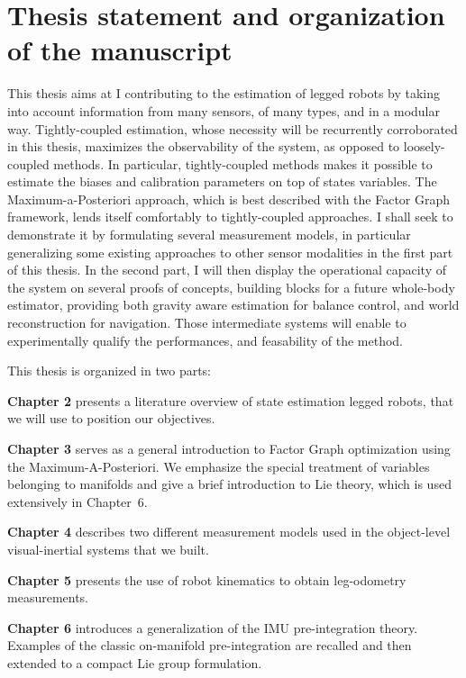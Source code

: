 \section{Thesis statement and organization of the manuscript}
\label{sec:thesis_organization}

This thesis aims at I contributing to the estimation of legged robots by taking into account information from
many sensors, of many types, and in a modular way. Tightly-coupled estimation, whose necessity will be recurrently corroborated in this thesis, maximizes the observability
of the system, as opposed to loosely-coupled methods. In particular, tightly-coupled methods makes it possible to estimate the biases and calibration parameters
on top of states variables. The Maximum-a-Posteriori approach, which is best described with the Factor Graph framework, lends itself comfortably 
to tightly-coupled approaches. I shall seek to demonstrate it by formulating several measurement models, in particular generalizing some existing approaches to other sensor modalities
in the first part of this thesis. In the second part,
I will then display the operational capacity of the system on several proofs of concepts, building blocks for a future whole-body estimator, providing both gravity aware
estimation for balance control, and world reconstruction for navigation. Those intermediate systems will enable to experimentally qualify the performances, 
and feasability of the method.

This thesis is organized in two parts:

\bigskip
\textbf{Chapter 2} presents a literature overview of state estimation legged robots, that we will use to position our objectives.

\bigskip
\textbf{Chapter 3} serves as a general introduction to Factor Graph optimization using the Maximum-A-Posteriori. We emphasize the special treatment of variables 
belonging to manifolds and give a brief introduction to Lie theory, which is used extensively in \mbox{Chapter 6}.

\bigskip
\textbf{Chapter 4} describes two different measurement models used in the object-level visual-inertial systems that we built. 

\bigskip
\textbf{Chapter 5} presents the use of robot kinematics to obtain leg-odometry measurements. 

\bigskip
\textbf{Chapter 6} introduces a generalization of the IMU pre-integration theory. Examples of the classic on-manifold pre-integration are recalled and 
then extended to a compact Lie group formulation. 

